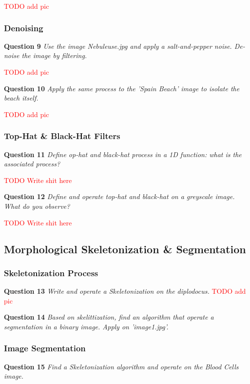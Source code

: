 \textcolor{red}{TODO add pic}

\subsubsection{Denoising}
\textbf{Question 9} \textit{Use the image Nebuleuse.jpg and apply a salt-and-pepper noise. De-noise the image by ﬁltering.}

\textcolor{red}{TODO add pic}


\textbf{Question 10} \textit{Apply the same process to the ’Spain Beach’ image to isolate the beach itself.}

\textcolor{red}{TODO add pic}


\subsubsection{Top-Hat \& Black-Hat Filters}
\textbf{Question 11} \textit{Deﬁne op-hat and black-hat process in a 1D function: what is the associated process?}

\textcolor{red}{TODO Write shit here}


\textbf{Question 12} \textit{Deﬁne and operate top-hat and black-hat on a greyscale image. What do you observe?}

\textcolor{red}{TODO Write shit here}


\subsection{Morphological Skeletonization \& Segmentation}
\subsubsection{Skeletonization Process}
\textbf{Question 13} \textit{Write and operate a Skeletonization on the diplodocus.}
\textcolor{red}{TODO add pic}


\textbf{Question 14} \textit{Based on skelittization, ﬁnd an algorithm that operate a segmentation in a binary image. Apply on ’image1.jpg’.}


\subsubsection{Image Segmentation}
\textbf{Question 15} \textit{Find a Skeletonization algorithm and operate on the Blood Cells image.}


